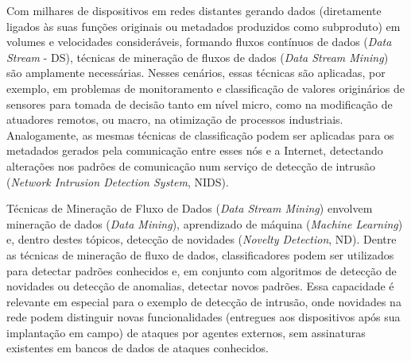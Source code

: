 Com milhares de dispositivos em redes distantes gerando dados (diretamente
ligados às suas funções originais ou metadados produzidos como subproduto) em
volumes e velocidades consideráveis, formando fluxos contínuos de dados (\emph{Data
Stream} - DS), técnicas de mineração de fluxos de dados
(\emph{Data Stream Mining}) são amplamente necessárias.
Nesses cenários, essas técnicas são
aplicadas, por exemplo, em problemas de monitoramento e classificação de valores
originários de sensores para tomada de decisão tanto em nível micro, como na
modificação de atuadores remotos, ou macro, na otimização de processos
industriais.
Analogamente, as mesmas técnicas de classificação podem ser aplicadas para os
metadados gerados pela comunicação entre esses nós e a Internet, detectando
alterações nos padrões de comunicação num serviço de detecção de intrusão
(\emph{Network Intrusion Detection System}, NIDS).



\newcommand{\nd}{ND\xspace}

Técnicas
de Mineração de Fluxo de Dados (\emph{Data Stream Mining}) envolvem mineração de dados
(\emph{Data Mining}), 
aprendizado de máquina
(\emph{Machine Learning}) e, dentro destes tópicos, detecção de novidades
(\emph{Novelty Detection}, \nd).
Dentre as técnicas de mineração de fluxo de dados, classificadores podem ser
utilizados para detectar padrões conhecidos e, em conjunto com algoritmos de
detecção de novidades ou detecção de anomalias, detectar novos padrões.
Essa capacidade é relevante em especial para o
exemplo de detecção de intrusão, onde novidades na rede podem distinguir novas
funcionalidades (entregues aos dispositivos após sua implantação em campo) de
ataques por agentes externos, sem assinaturas existentes em bancos de
dados de ataques conhecidos.

